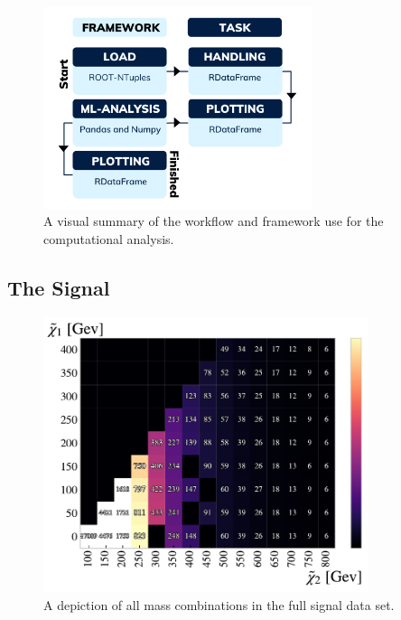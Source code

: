 \begin{figure}
    \centering
    \includegraphics[width=0.7\textwidth]{Figures/Illustrations/TaskFlow.png}
    \caption{A visual summary of the workflow and framework use for the 
    computational analysis. }
    \label{fig:WF}
\end{figure}

\subsection{The Signal}
\begin{figure}
  \centering
  \includegraphics[width=0.85\textwidth]{Figures/MLResults/NN/SUSY/Grid/NrSignalEvents.pdf}
  \caption{A depiction of all mass combinations in the full signal data set.}
  \label{fig:nrSignal}
\end{figure}

